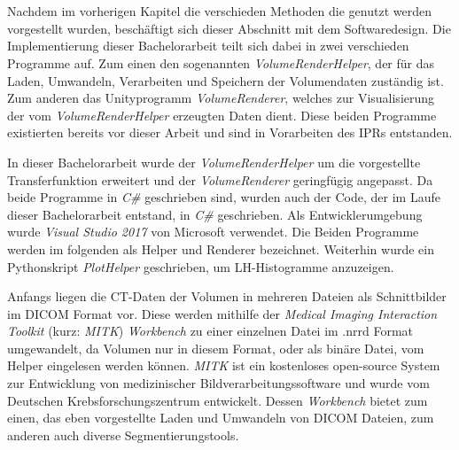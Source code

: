 \chapter{}
\label{sec:concept}


Nachdem im vorherigen Kapitel die verschieden Methoden die genutzt werden vorgestellt wurden, beschäftigt sich dieser Abschnitt mit dem Softwaredesign.
\newline
Die Implementierung dieser Bachelorarbeit teilt sich dabei in zwei verschieden Programme auf. Zum einen den sogenannten \textit{VolumeRenderHelper}, der für das Laden, Umwandeln, Verarbeiten und Speichern der Volumendaten zuständig ist.
Zum anderen das Unityprogramm \textit{VolumeRenderer}, welches zur Visualisierung der vom \textit{VolumeRenderHelper} erzeugten Daten dient. Diese beiden Programme existierten bereits vor dieser Arbeit und sind in Vorarbeiten des IPRs entstanden.


In dieser Bachelorarbeit wurde der \textit{VolumeRenderHelper} um die vorgestellte Transferfunktion erweitert und der \textit{VolumeRenderer} geringfügig angepasst. Da beide Programme in \textit{C\#} geschrieben sind, wurden auch der Code, der im Laufe dieser Bachelorarbeit entstand, in \textit{C\#} geschrieben. Als Entwicklerumgebung wurde \textit{Visual Studio 2017} von Microsoft verwendet. Die Beiden Programme werden im folgenden als Helper und Renderer bezeichnet. Weiterhin wurde ein Pythonskript \textit{PlotHelper} geschrieben, um LH-Histogramme anzuzeigen.


Anfangs liegen die CT-Daten der Volumen in mehreren Dateien als Schnittbilder im DICOM Format vor. Diese werden mithilfe der \textit{Medical Imaging Interaction Toolkit} (kurz: \textit{MITK}) \textit{Workbench} \cite{mitk} zu einer einzelnen Datei im .nrrd Format umgewandelt, da Volumen nur in diesem Format, oder als binäre Datei, vom Helper eingelesen werden können.
\textit{MITK} ist ein kostenloses open-source System zur Entwicklung von medizinischer Bildverarbeitungssoftware und wurde vom Deutschen Krebsforschungszentrum entwickelt. Dessen \textit{Workbench} bietet zum einen, das eben vorgestellte Laden und Umwandeln von DICOM Dateien, zum anderen auch diverse Segmentierungstools.


